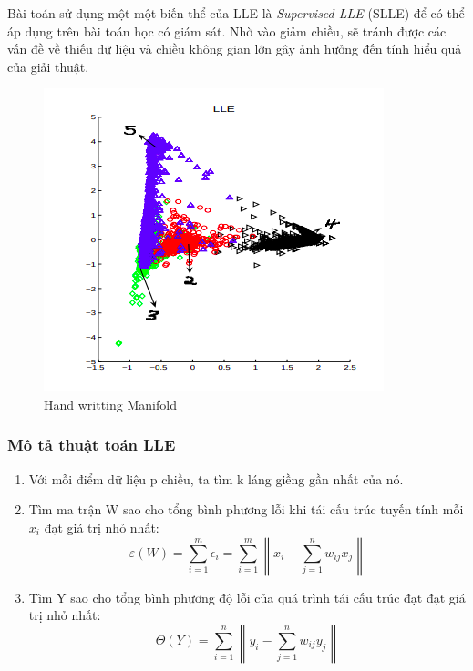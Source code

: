 \begin{enumerate}
	Bài toán sử dụng một một biến thể của LLE là \textit{Supervised LLE} (SLLE) để có thể áp dụng trên bài toán học có giám sát. Nhờ vào giảm chiều, sẽ tránh được các vấn đề về thiếu dữ liệu và chiều không gian lớn gây ảnh hưởng đến tính hiểu quả của giải thuật.
	\begin{figure}[H]
		\begin{center}
			\includegraphics[scale=0.5]{images/ex1/MLLE.png}
			\caption{Hand writting Manifold}
		\end{center}
	\end{figure}
\end{enumerate}

\subsubsection{Mô tả thuật toán LLE}
\begin{enumerate}
	\item Với mỗi điểm dữ liệu p chiều, ta tìm k láng giềng gần nhất của nó.
	\item Tìm ma trận W sao cho tổng bình phương lỗi khi tái cấu trúc tuyến tính mỗi $x_i$ đạt giá trị nhỏ nhất:
	\begin{equation}
		\varepsilon(W) = \sum_{i=1}^{m}{\epsilon_i} = \sum_{i=1}^{m}{\left\|x_i - \sum_{j=1}^{n}{w_{ij}x_j}\right\|}
	\end{equation}
	\item Tìm Y sao cho tổng bình phương độ lỗi của quá trình tái cấu trúc đạt đạt giá trị nhỏ nhất:
	\begin{equation}
		\Theta(Y) = \sum_{i=1}^{n}{\left\|y_i - \sum_{j=1}^{n}{w_{ij}y_j}\right\|}
	\end{equation}
\end{enumerate}
